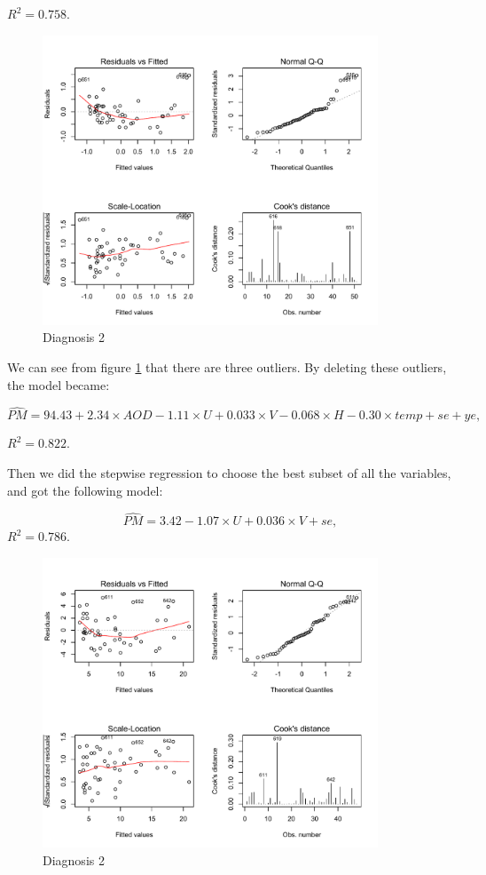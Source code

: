\documentclass[10pt]{article}
\begin{document}
$R^2 = 0.758$.

\begin{figure}[H]
\centering
\includegraphics[width = 100mm]{residual.pdf}
\caption{Diagnosis 2}
\label{d1}
\end{figure}

We can see from figure \ref{d1} that there are three outliers. By deleting these outliers, the model became:

$$\hat{PM} = 94.43 + 2.34\times AOD - 1.11\times U + 0.033\times V - 0.068\times H - 0.30\times temp + se + ye, $$

$R^2 = 0.822$.

Then we did the stepwise regression to choose the best subset of all the variables, and got the following model:

$$\hat{PM} = 3.42 -1.07\times U + 0.036\times V+ se, $$
$R^2 = 0.786$.

\begin{figure}[H]
\centering
\includegraphics[width = 100mm ]{residual2.pdf}
\caption{Diagnosis 2}
\label{d2}
\end{figure}
\end{document}
